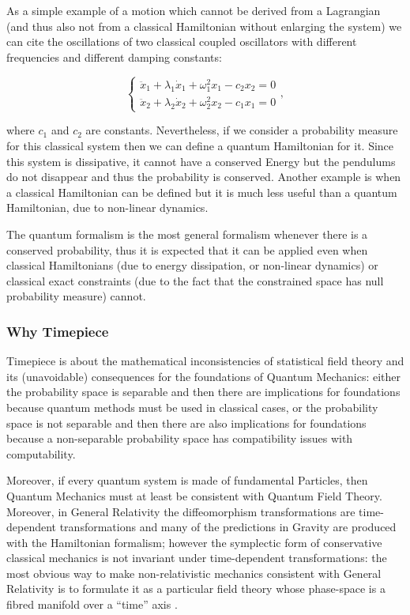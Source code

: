 \documentclass[11pt]{book}
\begin{document}
As a simple example of a motion which cannot be derived from a
Lagrangian (and thus also not from a classical Hamiltonian without
enlarging the system) we can
cite\cite{razavy2005classical} the
oscillations of two classical coupled oscillators with different
frequencies and different damping constants:

\begin{equation}\left\{\begin{array}{l}
\ddot{x}_{1}+\lambda_{1} \dot{x}_{1}+\omega_{1}^{2} x_{1}-c_{2} x_{2}=0 \\
\ddot{x}_{2}+\lambda_{2} \dot{x}_{2}+\omega_{2}^{2} x_{2}-c_{1} x_{1}=0
\end{array}\right.,\end{equation}

where \(c_1\) and \(c_2\) are constants. Nevertheless, if we consider a
probability measure for this classical system then we can define a
quantum Hamiltonian for it. Since this system is dissipative, it cannot
have a conserved Energy but the pendulums do not disappear and thus the
probability is conserved. Another example is when a classical
Hamiltonian can be defined but it is much less useful than a quantum
Hamiltonian, due to non-linear
dynamics\cite{2012Chaos..22d7510B}.

The quantum formalism is the most general formalism whenever there is a
conserved probability, thus it is expected that it can be applied even
when classical Hamiltonians (due to energy
dissipation\cite{razavy2005classical},
or non-linear
dynamics\cite{2012Chaos..22d7510B}) or classical exact constraints (due to the fact that the
constrained space has null probability measure) cannot.

\hypertarget{why-timepiece}{%
\subsubsection{Why Timepiece}\label{why-timepiece}}

Timepiece is about the mathematical inconsistencies of statistical field
theory and its (unavoidable) consequences for the foundations of Quantum
Mechanics: either the probability space is separable and then there are
implications for foundations because quantum methods must be used in
classical cases, or the probability space is not separable and then
there are also implications for foundations because a non-separable
probability space has compatibility issues with
computability\cite{computable}.

Moreover, if every quantum system is made of fundamental Particles, then
Quantum Mechanics must at least be consistent with Quantum Field Theory.
Moreover, in General Relativity the diffeomorphism transformations are
time-dependent transformations and many of the predictions in Gravity
are produced with the Hamiltonian formalism; however the symplectic form
of conservative classical mechanics is not invariant under
time-dependent transformations: the most obvious way to make
non-relativistic mechanics consistent with General Relativity is to
formulate it as a particular field theory whose phase-space is a fibred
manifold over a ``time'' axis
\cite{gaugemechanics2}.
\end{document}
